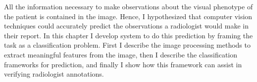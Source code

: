 All the information necessary to make observations about the visual phenotype of the patient is contained in the image. Hence, I hypothesized that computer vision techniques could accurately predict the observations a radiologist would make in their report. In this chapter I develop system to do this prediction by framing the task as a classification problem. First I describe the image processing methods to extract meaningful features from the image, then I describe the classification frameworks for prediction, and finally I show how this framework can assist in verifying radiologist annotations.